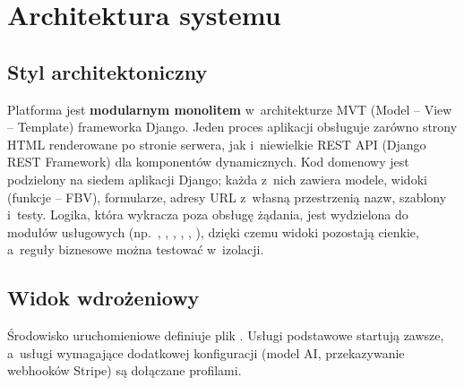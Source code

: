 \chapter{Architektura systemu}

\section{Styl architektoniczny}

Platforma jest \textbf{modularnym monolitem} w~architekturze MVT (Model -- View --
Template) frameworka Django. Jeden proces aplikacji obsługuje zarówno strony HTML
renderowane po stronie serwera, jak i~niewielkie REST API (Django REST Framework) dla
komponentów dynamicznych. Kod domenowy jest podzielony na siedem aplikacji Django;
każda z~nich zawiera modele, widoki (funkcje -- FBV), formularze, adresy URL z~własną
przestrzenią nazw, szablony i~testy. Logika, która wykracza poza obsługę żądania, jest
wydzielona do modułów usługowych (np.\ , ,
, , , ), dzięki czemu
widoki pozostają cienkie, a~reguły biznesowe można testować w~izolacji.

\section{Widok wdrożeniowy}

Środowisko uruchomieniowe definiuje plik . Usługi podstawowe
startują zawsze, a~usługi wymagające dodatkowej konfiguracji (model AI, przekazywanie
webhooków Stripe) są dołączane profilami.

